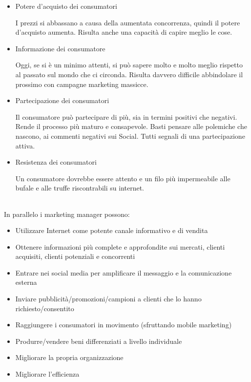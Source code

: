\documentclass[11pt]{article}
\begin{document}
\begin{itemize}[noitemsep, topsep=0ex]
	\item Potere d'acquisto dei consumatori
	
		\quad I prezzi si abbassano a causa della aumentata concorrenza, quindi il potere d'acquisto aumenta.
Risulta anche una capacità di capire meglio le cose.
	
	\item Informazione dei consumatore
	
		\quad Oggi, se si è un minimo attenti, si può sapere molto e molto meglio rispetto al passato sul mondo che ci circonda. Risulta davvero difficile abbindolare il prossimo con campagne marketing massicce.
	
	\item Partecipazione dei consumatori
	
		\quad Il consumatore può partecipare di più, sia in termini positivi che negativi.
Rende il processo più maturo e consapevole. Basti pensare alle polemiche che nascono, ai commenti negativi sui Social. Tutti segnali di una partecipazione attiva.
	
	\item Resistenza dei consumatori
	
		\quad Un consumatore dovrebbe essere attento e un filo più impermeabile alle bufale e alle truffe riscontrabili su internet.
	
\end{itemize}
~\\
\noindent In parallelo i marketing manager possono:
\begin{itemize}[noitemsep,topsep=0ex]
	\item Utilizzare Internet come potente canale informativo e di vendita
	\item Ottenere informazioni più complete e approfondite sui mercati, clienti acquisiti, clienti potenziali e concorrenti
	\item Entrare nei social media per amplificare il messaggio e la comunicazione esterna
	\item Inviare pubblicità/promozioni/campioni a clienti che lo hanno richiesto/consentito
	\item Raggiungere i consumatori in movimento (sfruttando mobile marketing)
	\item Produrre/vendere beni differenziati a livello individuale
	\item Migliorare la propria organizzazione
	\item Migliorare l'efficienza
\end{itemize}
~\\
\end{document}
